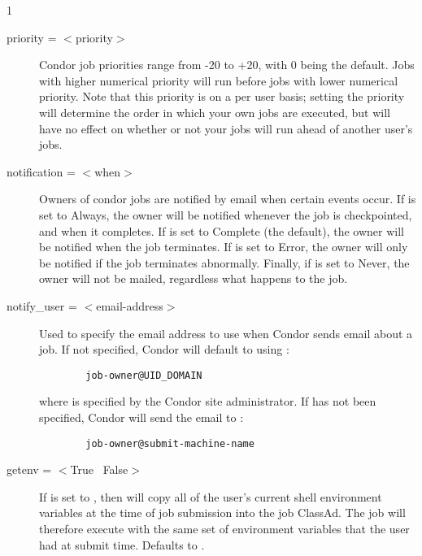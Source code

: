 \begin{ManPage}{\label{man-condor-submit}}{1}
\begin{description}

\item[priority = $<$priority$>$] Condor job priorities range from -20 to
+20, with 0 being the default. Jobs with higher numerical priority will
run before jobs with lower numerical priority. Note that this priority
is on a per user basis; setting the priority will determine the order in
which your own jobs are executed, but will have no effect on whether or
not your jobs will run ahead of another user's jobs. 


\item[notification = $<$when$>$]\label{man-condor-submit-notification} Owners of condor jobs are notified by
email when certain events occur. If  is set to
\mbox{Always}, the owner will be notified whenever the job is
checkpointed, and when it completes. If  is set to
\mbox{Complete} (the default), the owner will be notified when the
job terminates. If  is set to \mbox{Error}, the owner will
only be notified if the job terminates abnormally. Finally, if
 is set to \mbox{Never}, the owner will not be mailed,
regardless what happens to the job. 


\item[notify\_user = $<$email-address$>$]\label{man-condor-submit-notify-user} Used to specify the email
address to use when Condor sends email about a job.  If not specified,
Condor will default to using :
\begin{verbatim}
        job-owner@UID_DOMAIN
\end{verbatim}
where  is specified by the Condor site administrator.  If 
 has not been specified, Condor will send the email
to :
\begin{verbatim}
        job-owner@submit-machine-name
\end{verbatim}


\item[getenv = $<$True \Bar\ False$>$] If  is set to
, then  will copy all of the user's current
shell environment variables at the time of job submission into the job
ClassAd. The job will therefore execute with the same set of environment
variables that the user had at submit time. Defaults to .


\end{description}
\end{ManPage}
